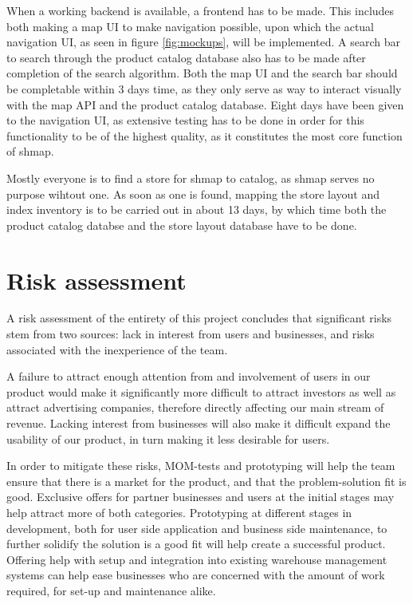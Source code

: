\documentclass[titlepage]{article}
\begin{document}
When a working backend is available, a frontend has to be made. This includes both making a map UI to make navigation possible, upon which the actual navigation UI, as seen in figure \ref{fig:mockups}, will be implemented. A search bar to search through the product catalog database also has to be made after completion of the search algorithm. Both the map UI and the search bar should be completable within 3 days time, as they only serve as way to interact visually with the map API and the product catalog database. Eight days have been given to the navigation UI, as extensive testing has to be done in order for this functionality to be of the highest quality, as it constitutes the most core function of shmap.

Mostly everyone is to find a store for shmap to catalog, as shmap serves no purpose wihtout one. As soon as one is found, mapping the store layout and index inventory is to be carried out in about 13 days, by which time both the product catalog databse and the store layout database have to be done.

\section{Risk assessment}

A risk assessment of the entirety of this project concludes that significant risks stem from two sources: lack in interest from users and businesses, and risks associated with the inexperience of the team.

A failure to attract enough attention from and involvement of users in our product would make it significantly more difficult to attract investors as well as attract advertising companies, therefore directly affecting our main stream of revenue. Lacking interest from businesses will also make it difficult expand the usability of our product, in turn making it less desirable for users.

In order to mitigate these risks, MOM-tests and prototyping will help the team ensure that there is a market for the product, and that the problem-solution fit is good. Exclusive offers for partner businesses and users at the initial stages may help attract more of both categories. Prototyping at different stages in development, both for user side application and business side maintenance, to further solidify the solution is a good fit will help create a successful product. Offering help with setup and integration into existing warehouse management systems can help ease businesses who are concerned with the amount of work required, for set-up and maintenance alike. 
\end{document}
